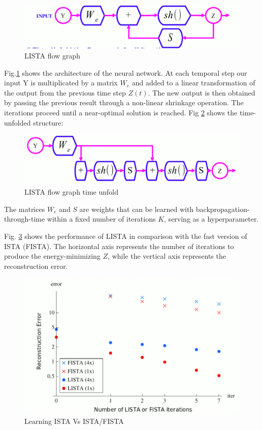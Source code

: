 \begin{figure}[H]
  \includegraphics[width=\linewidth]{figs/FISTAFlowGraph.jpg}
  \caption{LISTA flow graph}
  \label{fig:fistaFlowGraph}
\end{figure}

Fig.\ref{fig:fistaFlowGraph} shows the architecture of the neural network. At each temporal step our input Y is multiplicated by a matrix $W_e$ and added to a linear transformation of the output from the previous time step $Z(t)$. The new output is then obtained by passing the previous result through a non-linear shrinkage operation. The iterations proceed until a near-optimal solution is reached. Fig \ref{fig:fistaFlowGraphTimeUnfold} shows the time-unfolded structure: 

\begin{figure}[H]
  \includegraphics[width=\linewidth]{figs/FISTAFlowGraphTimeUnfold.jpg}
  \caption{LISTA flow graph time unfold}
  \label{fig:fistaFlowGraphTimeUnfold}
\end{figure}

The matrices $W_e$ and $S$ are weights that can be learned with backpropagation-through-time within a fixed number of iterations $K$, serving as a hyperparameter.

Fig. \ref{fig:listaFista} shows the performance of LISTA in comparison with the fast version of ISTA (FISTA). The horizontal axis represents the number of iterations to produce the energy-minimizing $Z$, while the vertical axis represents the reconstruction error. 


\begin{figure}[h!]
  \includegraphics[width=\linewidth]{figs/FISTALISTA.jpg}
  \caption{Learning ISTA Vs ISTA/FISTA}
  \label{fig:listaFista}
\end{figure}

